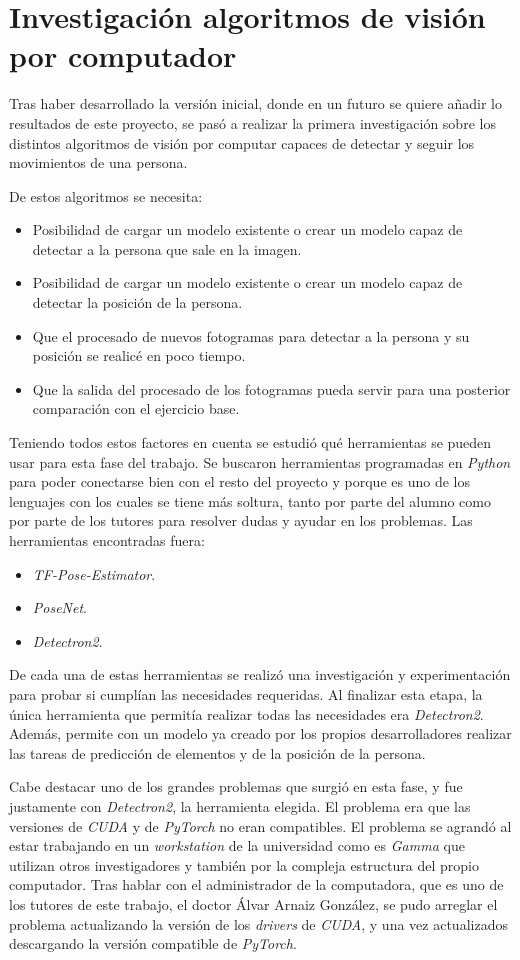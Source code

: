 {\section{Investigación algoritmos de visión por computador}
Tras haber desarrollado la versión inicial, donde en un futuro se quiere añadir lo resultados de este proyecto, se pasó a realizar la primera investigación sobre los distintos algoritmos de visión por computar capaces de detectar y seguir los movimientos de una persona. 

De estos algoritmos se necesita:
\begin{itemize}
	\item Posibilidad de cargar un modelo existente o crear un modelo capaz de detectar a la persona que sale en la imagen.
	\item Posibilidad de cargar un modelo existente o crear un modelo capaz de detectar la posición de la persona.
	\item Que el procesado de nuevos fotogramas para detectar a la persona y su posición se realicé en poco tiempo.
	\item Que la salida del procesado de los fotogramas pueda servir para una posterior comparación con el ejercicio base.
\end{itemize}

Teniendo todos estos factores en cuenta se estudió qué herramientas se pueden usar para esta fase del trabajo. Se buscaron herramientas programadas en \textit{Python} para poder conectarse bien con el resto del proyecto y porque es uno de los lenguajes con los cuales se tiene más soltura, tanto por parte del alumno como por parte de los tutores para resolver dudas y ayudar en los problemas. Las herramientas encontradas fuera:
\begin{itemize}
	\item \textit{TF-Pose-Estimator}.
	\item \textit{PoseNet}.
	\item \textit{Detectron2}.
\end{itemize}

De cada una de estas herramientas se realizó una investigación y experimentación para probar si cumplían las necesidades requeridas. Al finalizar esta etapa, la única herramienta que permitía realizar todas las necesidades era \textit{Detectron2}. Además, permite con un modelo ya creado por los propios desarrolladores realizar las tareas de predicción de elementos y de la posición de la persona.

Cabe destacar uno de los grandes problemas que surgió en esta fase, y fue justamente con \textit{Detectron2}, la herramienta elegida. El problema era que las versiones de \textit{CUDA} y de \textit{PyTorch} no eran compatibles. El problema se agrandó al estar trabajando en un \textit{workstation} de la universidad como es \textit{Gamma} que utilizan otros investigadores y también por la compleja estructura del propio computador. Tras hablar con el administrador de la computadora, que es uno de los tutores de este trabajo, el doctor Álvar Arnaiz González, se pudo arreglar el problema actualizando la versión de los \textit{drivers} de \textit{CUDA}, y una vez actualizados descargando la versión compatible de \textit{PyTorch}. 
}
